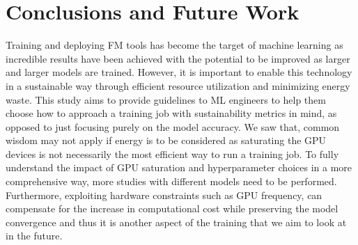 \documentclass{article}
\begin{document}
    \section{Conclusions and Future Work}
    {
        Training and deploying FM tools has become the target of machine learning as incredible results have been achieved with the potential to be improved as larger and larger models are trained. However, it is important to enable this technology in a sustainable way through efficient resource utilization and minimizing energy waste. This study aims to provide guidelines to ML engineers to help them choose how to approach a training job with sustainability metrics in mind, as opposed to just focusing purely on the model accuracy. We saw that, common wisdom may not apply if energy is to be considered as saturating the GPU devices is not necessarily the most efficient way to run a training job. To fully understand the impact of GPU saturation and hyperparameter choices in a more comprehensive way, more studies with different models need to be performed. Furthermore, exploiting hardware constraints such as GPU frequency, can compensate for the increase in computational cost while preserving the model convergence and thus it is another aspect of the training that we aim to look at in the future.
    }

    \clearpage

    \appendix
\end{document}
